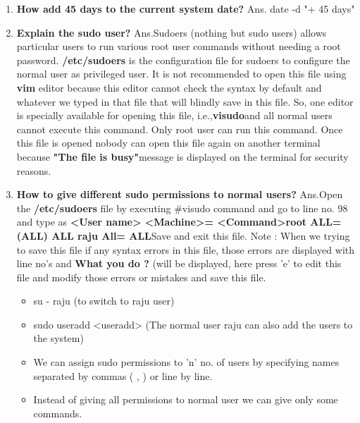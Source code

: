 \begin{enumerate}
    \bigskip
    \bigskip

    \item\textbf{How add 45 days to the current system date?}
    \newline
    Ans. date   -d    "+  45 days"
   
    \bigskip
    \bigskip

    \item\textbf{Explain the sudo user?}
    \newline
    Ans.Sudoers (nothing but sudo users) allows particular users to run various root user commands without needing a root password. 
    \textbf{/etc/sudoers} is the configuration file for sudoers to configure the normal user as privileged user.
    It is not recommended to open this file using \textbf{vim }   editor because this editor cannot check the syntax by default and whatever we typed in that file that will blindly save in this file.
    So, one editor is specially available for opening this file, i.e.,\textbf{visudo}and all normal users cannot execute this command. Only root user can run this command.
    Once this file is opened nobody can open this file again on another terminal because \textbf{"The file is busy"}message is displayed on the terminal for security reasons.
    
    \bigskip
    \bigskip

    \item\textbf{How to give different  sudo permissions to normal users?}
    \newline
    Ans.Open the \textbf{/etc/sudoers} file by executing    #visudo    command and go to line no. 98 and type as 
    \textbf{<User name>	<Machine>=	<Command>root
           \newline
            ALL=(ALL)	        ALL
            \newline
	         raju		      All=		        ALL}Save and exit this file.
            \newline
    Note :  When we trying to save this file if any syntax errors in this file, those errors are displayed with line no's and \textbf{What you do ?} (will be displayed, here press  'e'  to edit this file and modify those errors or mistakes and save this file.
       \begin{itemize}
          \item su -  raju	(to switch to raju user)
          \item sudo   useradd   <useradd>	(The normal user raju can also add the users to the system)
          \item 	We can assign sudo permissions to  'n'  no. of users by specifying names separated by commas ( , ) or line by   line.
          \item	Instead of giving all permissions to normal user we can give only some commands.
          

\end{itemize}
\end{enumerate}
